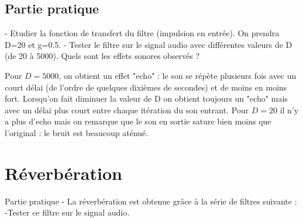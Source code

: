 
\subsection{Partie pratique}

- Etudier la fonction de transfert du filtre (impulsion en entrée). On prendra D=20 et g=0.5.
- Tester le filtre sur le signal audio avec différentes valeurs de D (de 20 à 5000). Quels sont les effets sonores observés ?

Pour $D = 5000$, on obtient un effet "echo" : le son se répète plusieurs fois avec un court délai (de l'ordre de quelques dixièmes de secondes) et de moins en moins fort. Lorsqu'on fait diminuer la valeur de D on obtient toujours un "echo" mais avec un délai plus court entre chaque itération du son entrant. Pour $D = 20$ il n'y a plus d'echo mais on remarque que le son en sortie sature bien moins que l'original : le bruit est beaucoup aténué.

\section{Réverbération}

Partie pratique
- La réverbération est obtenue grâce à la série de filtres suivante :
-Tester ce filtre sur le signal audio.
